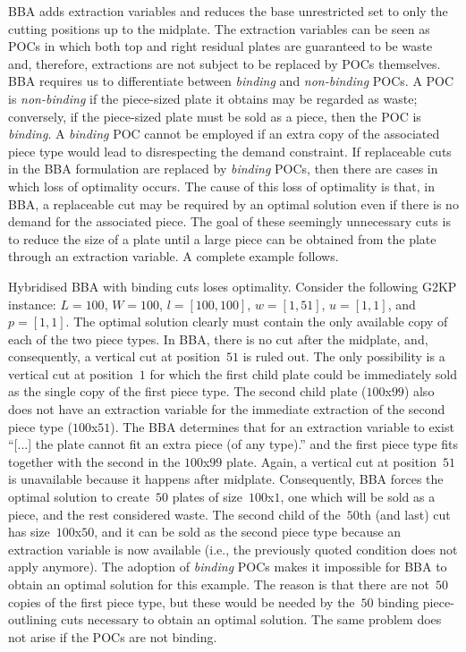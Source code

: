 \documentclass[ppgc,tese,english,formais,babel]{iiufrgs}
\begin{document}
BBA adds extraction variables and reduces the base unrestricted set to only the cutting positions up to the midplate.
The extraction variables can be seen as POCs in which both top and right residual plates are guaranteed to be waste and, therefore, extractions are not subject to be replaced by POCs themselves.
BBA requires us to differentiate between \emph{binding} and \emph{non-binding} POCs.
A POC is \emph{non-binding} if the piece-sized plate it obtains may be regarded as waste; conversely, if the piece-sized plate must be sold as a piece, then the POC is \emph{binding}.
A \emph{binding} POC cannot be employed if an extra copy of the associated piece type would lead to disrespecting the demand constraint.
If replaceable cuts in the BBA formulation are replaced by \emph{binding} POCs, then there are cases in which loss of optimality occurs.
The cause of this loss of optimality is that, in BBA, a replaceable cut may be required by an optimal solution even if there is no demand for the associated piece.
The goal of these seemingly unnecessary cuts is to reduce the size of a plate until a large piece can be obtained from the plate through an extraction variable.
A complete example follows.

\begin{example}{Hybridised BBA with binding cuts loses optimality.}
Consider the following G2KP instance: \(L = 100\), \(W = 100\), \(l = [100, 100]\), \(w = [1, 51]\), \(u = [1, 1]\), and \(p = [1, 1]\).
The optimal solution clearly must contain the only available copy of each of the two piece types.
In BBA, there is no cut after the midplate, and, consequently, a vertical cut at position~\(51\) is ruled out.
The only possibility is a vertical cut at position~\(1\) for which the first child plate could be immediately sold as the single copy of the first piece type.
The second child plate (\(100\)x\(99\)) also does not have an extraction variable for the immediate extraction of the second piece type (\(100\)x\(51\)).
The BBA determines that for an extraction variable to exist ``[...] the plate cannot fit an extra piece (of any type).'' and the first piece type fits together with the second in the \(100\)x\(99\) plate.
Again, a vertical cut at position~\(51\) is unavailable because it happens after midplate.
Consequently, BBA forces the optimal solution to create~\(50\) plates of size~\(100\)x\(1\), one which will be sold as a piece, and the rest considered waste.
The second child of the~\(50\)th (and last) cut has size~\(100\)x\(50\), and it can be sold as the second piece type because an extraction variable is now available (i.e., the previously quoted condition does not apply anymore).
The adoption of \emph{binding} POCs makes it impossible for BBA to obtain an optimal solution for this example.
The reason is that there are not~\(50\) copies of the first piece type, but these would be needed by the~\(50\) binding piece-outlining cuts necessary to obtain an optimal solution.
The same problem does not arise if the POCs are not binding.
\end{example}
\end{document}
